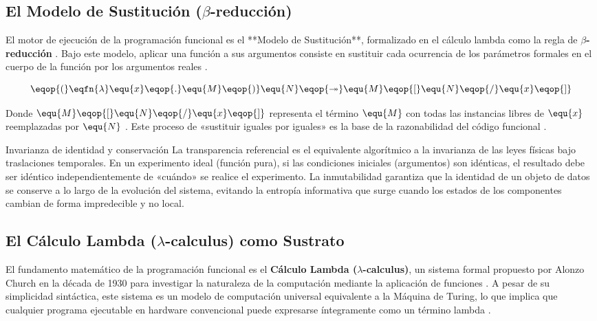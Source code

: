 \subsection*{El Modelo de Sustitución ($\beta$-reducción)}

El motor de ejecución de la programación funcional es el **Modelo de Sustitución**, formalizado en el cálculo lambda como la regla de \textbf{$\beta$-reducción} \cite{SICP, PFPL}. Bajo este modelo, aplicar una función a sus argumentos consiste en sustituir cada ocurrencia de los parámetros formales en el cuerpo de la función por los argumentos reales \cite{SICP, TAPL}.

\begin{equation}
    \eqop{(}\eqfn{\lambda} \equ{x} \eqop{.} \equ{M}\eqop{)} \equ{N} \eqop{\twoheadrightarrow} \equ{M}\eqop{[}\equ{N}\eqop{/}\equ{x}\eqop{]}
\end{equation}

Donde $\equ{M}\eqop{[}\equ{N}\eqop{/}\equ{x}\eqop{]}$ representa el término $\equ{M}$ con todas las instancias libres de $\equ{x}$ reemplazadas por $\equ{N}$ \cite{PFPL, TAPL}. Este proceso de «sustituir iguales por iguales» es la base de la razonabilidad del código funcional \cite{HtDP}.

\begin{fisicaconexion}{Invarianza de identidad y conservación}
La transparencia referencial es el equivalente algorítmico a la invarianza de las leyes físicas bajo traslaciones temporales. En un experimento ideal (función pura), si las condiciones iniciales (argumentos) son idénticas, el resultado debe ser idéntico independientemente de «cuándo» se realice el experimento. La inmutabilidad garantiza que la identidad de un objeto de datos se conserve a lo largo de la evolución del sistema, evitando la entropía informativa que surge cuando los estados de los componentes cambian de forma impredecible y no local.
\end{fisicaconexion}

\subsection{El Cálculo Lambda ($\lambda$-calculus) como Sustrato}
\label{subsec:4_1_3_calculo_lambda}

El fundamento matemático de la programación funcional es el \textbf{Cálculo Lambda ($\lambda$-calculus)}, un sistema formal propuesto por Alonzo Church en la década de 1930 para investigar la naturaleza de la computación mediante la aplicación de funciones \cite{PFPL, TAPL}. A pesar de su simplicidad sintáctica, este sistema es un modelo de computación universal equivalente a la Máquina de Turing, lo que implica que cualquier programa ejecutable en hardware convencional puede expresarse íntegramente como un término lambda \cite{PFPL}.

